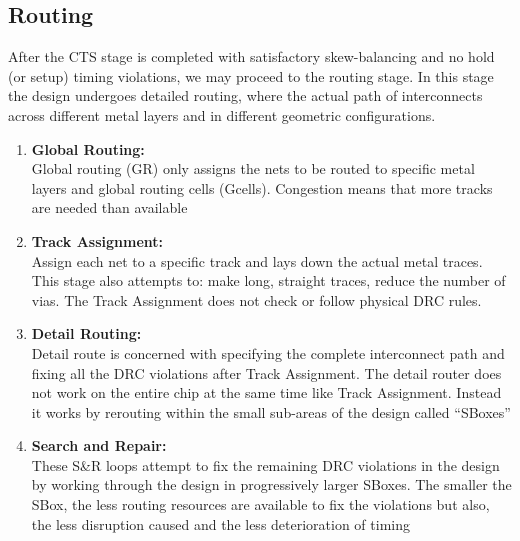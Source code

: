 \documentclass[../main.tex]{subfiles}
\begin{document}
 \subsection{Routing}
After the CTS stage is completed with satisfactory skew-balancing and no hold (or setup) timing
violations, we may proceed to the routing stage. In this stage the design undergoes detailed routing,
where the actual path of interconnects across different metal layers and in different geometric configurations.
\begin{enumerate}
\item \textbf{Global Routing:}\\
Global routing (GR) only assigns the nets to be routed to specific metal layers and global routing cells (Gcells). Congestion means that more tracks are needed than available

\item \textbf{Track Assignment:}\\
Assign each net to a specific track and lays down the actual metal traces. This stage also attempts to: make long, straight traces, reduce the number of vias. The Track Assignment does not check or follow physical DRC rules.

\item \textbf{Detail Routing:}\\
Detail route is concerned with specifying the complete interconnect path and fixing all the DRC violations after Track Assignment. The detail router does not work on the entire chip at the same time like Track Assignment. Instead it works by rerouting within the small sub-areas of the design called “SBoxes”

\item \textbf{Search and Repair:}\\
These S\&R loops attempt to fix the remaining DRC violations in the design by working through the design in progressively larger SBoxes. The smaller the SBox, the less routing resources are available to fix the violations but also, the less disruption caused and the less deterioration of timing
\end{enumerate}
\end{document}
